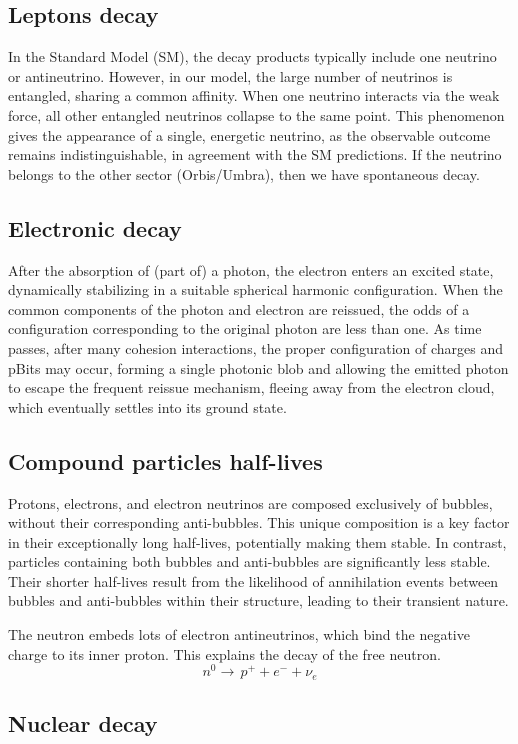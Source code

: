 \documentclass{ijuc}
\begin{document}
\subsection{Leptons decay}
In the Standard Model (SM), the decay products typically include one neutrino or antineutrino. 
However, in our model, the large number of neutrinos is entangled, sharing a common affinity. 
When one neutrino interacts via the weak force, all other entangled neutrinos collapse to the same point. 
This phenomenon gives the appearance of a single, energetic neutrino, as the observable outcome remains indistinguishable, in agreement with the SM predictions.
If the neutrino belongs to the other sector (Orbis/Umbra), then we have spontaneous decay.

\subsection{Electronic decay}
After the absorption of (part of) a photon, the electron enters an excited state, dynamically stabilizing in a suitable spherical harmonic configuration. 
When the common components of the photon and electron are reissued, the odds of a configuration corresponding to the original photon are less than one. 
As time passes, after many cohesion interactions, the proper configuration of charges and pBits may occur, forming a single photonic blob and allowing the emitted photon to escape the frequent reissue mechanism, fleeing away from the electron cloud, which eventually settles into its ground state.

\subsection{Compound particles half-lives}
Protons, electrons, and electron neutrinos are composed exclusively of bubbles, without their corresponding anti-bubbles. 
This unique composition is a key factor in their exceptionally long half-lives, potentially making them stable. 
In contrast, particles containing both bubbles and anti-bubbles are significantly less stable. 
Their shorter half-lives result from the likelihood of annihilation events between bubbles and anti-bubbles within their structure, leading to their transient nature.

The neutron embeds lots of electron antineutrinos, which bind the negative charge to its inner proton. 
This explains the decay of the free neutron.
\[
n^0\rightarrow\,p^{+}+e^{-}+\nu_e
\]

\subsection{Nuclear decay}
\end{document}
